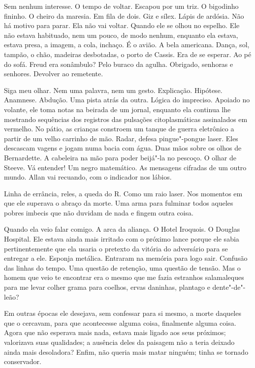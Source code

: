 Sem nenhum interesse. O tempo de voltar. Escapou por um triz. O
bigodinho fininho. O cheiro da maresia. Em fila de dois. Giz e sílex.
Lápis de ardósia. Não há motivo para parar. Ela não vai voltar. Quando
ele se olhou no espelho. Ele não estava habituado, nem um pouco, de modo
nenhum, enquanto ela estava, estava presa, a imagem, a cola, inchaço. É
o avião. A bela americana. Dança, sol, tampão, o chão, madeiras
desbotadas, o porto de Cassis. Era de se esperar. Ao pé do sofá. Freud
era sonâmbulo? Pelo buraco da agulha. Obrigado, senhoras e senhores.
Devolver ao remetente.

Siga meu olhar. Nem uma palavra, nem um gesto. Explicação. Hipótese.
Anamnese. Abdução. Uma pista atrás da outra. Lógica do impreciso.
Apoiado no volante, ele toma notas na beirada de um jornal, enquanto ela
continua lhe mostrando sequências dos registros das pulsações
citoplasmáticas assinalados em vermelho. No pátio, as crianças constroem
um tanque de guerra eletrônico a partir de um velho carrinho de mão.
Radar, defesa pingue"-pongue laser. Eles descascam vagens e jogam numa
bacia com água. Duas mãos sobre os olhos de Bernardette. A cabeleira na
mão para poder beijá"-la no pescoço. O olhar de Steeve. Vá entender! Um
negro matemático. As mensagens cifradas de um outro mundo. Allan vai
recuando, com o indicador nos lábios.

Linha de errância, reles, a queda do R. Como um raio laser. Nos momentos
em que ele superava o abraço da morte. Uma arma para fulminar todos
aqueles pobres imbecis que não duvidam de nada e fingem outra coisa.

Quando ela veio falar comigo. A arca da aliança. O Hotel Iroquois. O
Douglas Hospital. Ele estava ainda mais irritado com o próximo lance
porque ele sabia pertinentemente que ela usaria o pretexto da vitória do
adversário para se entregar a ele. Esponja metálica. Entraram na memória
para logo sair. Confusão das linhas do tempo. Uma questão de retenção,
uma questão de tensão. Mas o homem que veio te encontrar era o mesmo que
me fazia estranhos salamaleques para me levar colher grama para coelhos,
ervas daninhas, plantago e dente"-de"-leão?

Em outras épocas ele desejava, sem confessar para si mesmo, a morte
daqueles que o cercavam, para que acontecesse alguma coisa, finalmente
alguma coisa. Agora que não esperava mais nada, estava mais ligado aos
seus próximos; valorizava suas qualidades; a ausência deles da paisagem
não a teria deixado ainda mais desoladora? Enfim, não queria mais matar
ninguém; tinha se tornado conservador.

